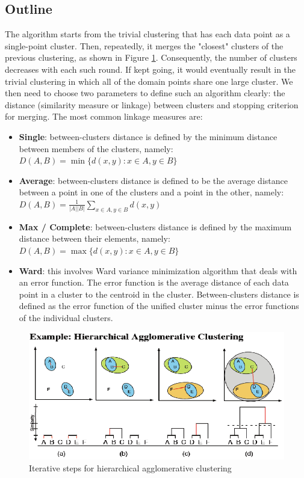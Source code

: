 \subsection{Outline}
The algorithm starts from the trivial clustering that has each data point as a single-point cluster. Then, repeatedly, it merges the "closest" clusters of the previous clustering, as shown in Figure \ref{fig: hac}. Consequently, the number of clusters decreases with each such round. If kept going, it would eventually result in the trivial clustering in which all of the domain points share one large cluster. We then need to choose two parameters to define such an algorithm clearly: the distance (similarity measure or linkage) between clusters and stopping criterion for merging. The most common linkage measures are:
\begin{itemize}
	\item \textbf{Single}: between-clusters distance is defined by the minimum distance between members of the clusters, namely: $D(A,B) = \min \{d(x,y): x \in A, y \in B\}$
	\item \textbf{Average}: between-clusters distance is defined to be the average distance between a point in one of the clusters and a point in the other, namely:\\ $D(A,B) = \frac{1}{|A||B|}\sum\limits_{x \in A, y \in B}d(x,y)$
	\item \textbf{Max / Complete}: between-clusters distance is defined by the maximum distance between their elements, namely: $D(A,B) = \max \{d(x,y): x \in A, y \in B\}$
	\item \textbf{Ward}: this involves Ward variance minimization algorithm that deals with an error function. The error function is the average distance of each data point in a cluster to the centroid in the cluster. Between-clusters distance is defined as the error function of the unified cluster minus the error functions of the individual clusters.
\end{itemize}

\begin{figure}[h] 
	\centering
	\includegraphics[scale = 0.5]{Figures/hierarchical_clustering.png}
	\caption{Iterative steps for hierarchical agglomerative clustering}
	\label{fig: hac}
\end{figure}
 
